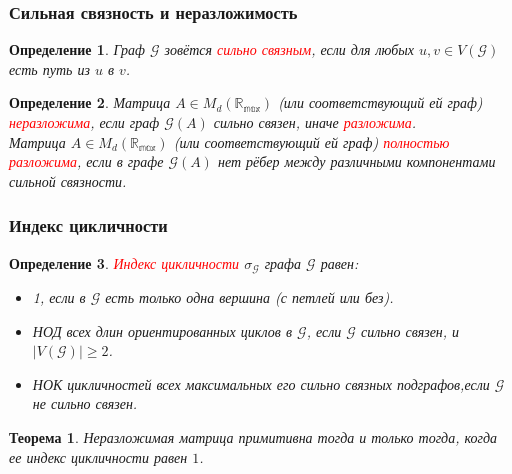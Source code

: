 \documentclass{beamer}
\newtheorem*{Th}{Теорема}
\newtheorem*{Def}{Определение}
\newtheorem*{Rem}{Замечание}
\newcommand{\cred}[1]{\textcolor{red}{#1}}
\begin{document}
\begin{frame}
\frametitle{Сильная связность и неразложимость}
	\begin{Def}
		Граф $\mathcal{G}$ зовётся \cred{сильно связным}, если для любых $u, v \in V(\mathcal{G})$ есть путь из $u$ в $v$.
	\end{Def}
	
	\begin{Def}
Матрица $A \in M_d(\mathbb{R_{\max}})$ (или соответствующий ей граф) \cred{неразложима}, если граф $\mathcal{G}(A)$ сильно связен, иначе \cred{разложима}.\\
Матрица $A \in M_d(\mathbb{R_{\max}})$ (или соответствующий ей граф) \cred{полностью разложима}, если в графе $\mathcal{G}(A)$ нет рёбер между различными компонентами сильной связности.\\
	\end{Def}
\end{frame}


\begin{frame}
\frametitle{Индекс цикличности}
\begin{Def}
	\cred{Индекс цикличности} $\sigma_{\mathcal{G}}$ графа $\mathcal{G}$ равен:
	\begin{itemize}
		\item 1, если в $\mathcal{G}$ есть только одна вершина (с петлей или без). 
		\item НОД всех длин ориентированных циклов в $\mathcal{G}$, если $\mathcal{G}$ сильно связен, и $|V(\mathcal{G})| \ge 2$.
		\item НОК цикличностей всех максимальных его сильно связных подграфов,если $\mathcal{G}$ не сильно связен.
	\end{itemize}
\end{Def}
\begin{Th}
Неразложимая матрица примитивна тогда и только тогда, когда ее индекс цикличности равен $1$.
\end{Th}
\end{frame}

\end{document}
